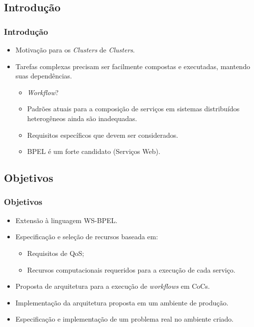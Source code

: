 \documentclass[red, cover=invisible, theme=Warsaw]{myslides}
\begin{document}
    \subsection*{Introdução}
    \begin{frame} \frametitle{Introdução}
	\begin{itemize}
	    \item Motivação para os \textit{Clusters} de \textit{Clusters}.
	    \item Tarefas complexas precisam ser facilmente compostas e executadas, mantendo suas dependências.
	    \begin{itemize}
		    \item \textit{Workflow}?
		    \item Padrões atuais para a composição de serviços em sistemas distribuídos heterogêneos ainda são inadequadas.
		    \item Requisitos específicos que devem ser considerados.
		    \item BPEL é um forte candidato (Serviços Web).
	    \end{itemize}	    
	\end{itemize}	
    \end{frame}
    
    \subsection{Objetivos}
	\begin{frame} \frametitle{Objetivos}
		\begin{itemize}
		    \item Extensão à linguagem WS-BPEL.
		    \item Especificação e seleção de recursos baseada em:
			\begin{itemize}
			 \item Requisitos de QoS;
			 \item Recursos computacionais requeridos para a execução de cada serviço.
			\end{itemize}
		    \item Proposta de arquitetura para a execução de \textit{workflows} em CoCs.
		    \item Implementação da arquitetura proposta em um ambiente de produção.
		    \item Especificação e implementação de um problema real no ambiente criado.
	    \end{itemize}		
	\end{frame}
\end{document}
